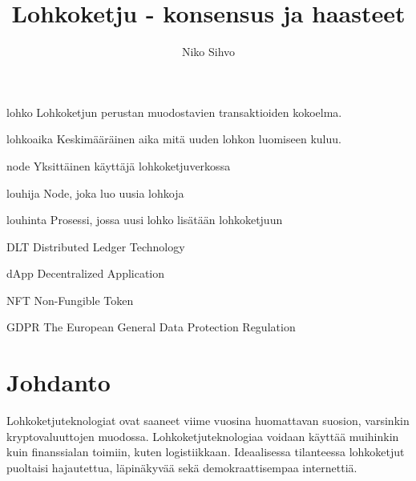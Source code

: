 \documentclass[utf8,bachelor]{gradu3}
\begin{document}
\title{Lohkoketju - konsensus ja haasteet}
\tiivistelma{%

}
\abstract{%

}

\author{Niko Sihvo}


\maketitle


\begin{thetermlist}
\item[lohko] Lohkoketjun perustan muodostavien transaktioiden kokoelma.
\item[lohkoaika] Keskimääräinen aika mitä uuden lohkon luomiseen kuluu.
\item[node] Yksittäinen käyttäjä lohkoketjuverkossa
\item[louhija] Node, joka luo uusia lohkoja
\item[louhinta] Prosessi, jossa uusi lohko lisätään lohkoketjuun 
\item[DLT] Distributed Ledger Technology
\item[dApp] Decentralized Application
\item[NFT] Non-Fungible Token
\item[GDPR] The European General Data Protection Regulation
\end{thetermlist}

\mainmatter

\chapter{Johdanto}

Lohkoketjuteknologiat ovat saaneet viime vuosina huomattavan suosion, varsinkin kryptovaluuttojen muodossa. Lohkoketjuteknologiaa voidaan käyttää muihinkin kuin finanssialan toimiin, kuten logistiikkaan. 
Ideaalisessa tilanteessa lohkoketjut puoltaisi hajautettua, läpinäkyvää sekä demokraattisempaa internettiä.
\end{document}
